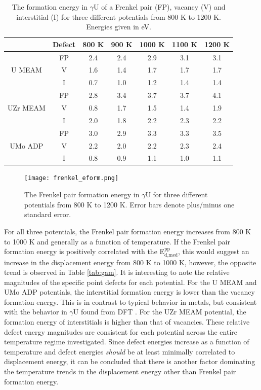 \documentclass[review]{elsarticle}
\begin{document}
\begin{table}[h]
\caption{The formation energy in $\gamma$U of a Frenkel pair (FP), vacancy (V) and interstitial (I) for three different potentials from 800 K to 1200 K. Energies given in eV.} \label{tab:eform}
\begin{center}
\begin{tabular}{|c|c|c|c|c|c|c|}
	\hline
			& Defect	& 800 K & 900 K & 1000 K & 1100 K & 1200 K\\
	 \hline
			& FP	 & 2.4 & 2.4 & 2.9 & 3.1 & 3.1 \\
	 U MEAM 	& V	& 1.6 & 1.4 & 1.7 & 1.7 & 1.7 \\
	 		& I	& 0.7 & 1.0 & 1.2 & 1.4 & 1.4 \\
	\hline
	 		& FP	& 2.8 & 3.4 & 3.7 & 3.7 & 4.1 \\
	 UZr MEAM & V & 0.8 & 1.7 & 1.5 & 1.4 & 1.9 \\
			& I	& 2.0 & 1.8 & 2.2 & 2.3 & 2.2 \\
	 \hline
	 		& FP	& 3.0 & 2.9 & 3.3 & 3.3 & 3.5 \\
	 UMo ADP & V	& 2.2 & 2.0 & 2.2 & 2.3 & 2.4 \\
	 		& I	& 0.8 & 0.9 & 1.1 & 1.0 & 1.1 \\
	 \hline
\end{tabular}
\end{center}
\label{default}
\end{table}

\begin{figure}[h]
 \centering
 \texttt{[image: frenkel\_eform.png]} 
 \caption{The Frenkel pair formation energy in $\gamma$U for three different potentials from 800 K to 1200 K. Error bars denote plus/minus one standard error.}
 \label{fig:eform}
\end{figure}

\FloatBarrier

For all three potentials, the Frenkel pair formation energy increases from 800 K to 1000 K and generally as a function of temperature. If the Frenkel pair formation energy is positively correlated with the E$^{\textrm{pp}}_{\textrm{d,med}}$, this would suggest an increase in the displacement energy from 800 K to 1000 K, however, the opposite trend is observed in Table \ref{tab:gam}. It is interesting to note the relative magnitudes of the specific point defects for each potential. For the U MEAM and UMo ADP potentials, the interstitial formation energy is lower than the vacancy formation energy. This is in contrast to typical behavior in metals, but consistent with the behavior in $\gamma$U found from DFT \cite{beeler2010}. For the UZr MEAM potential, the formation energy of interstitials is higher than that of vacancies. These relative defect energy magnitudes are consistent for each potential across the entire temperature regime investigated. Since defect energies increase as a function of temperature and defect energies \textit{should} be at least minimally correlated to displacement energy, it can be concluded that there is another factor dominating the temperature trends in the displacement energy other than Frenkel pair formation energy.
\end{document}
